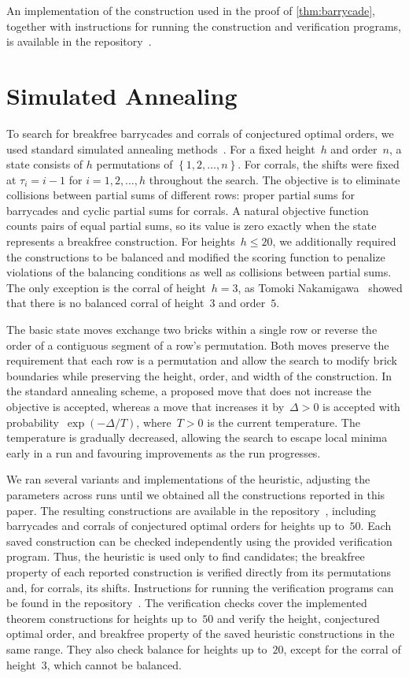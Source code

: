 \documentclass[runningheads,envcountsame]{llncs}
\newcommand{\set}[1]{\left\{ #1 \right\}}
\let\le\leqslant
\begin{document}
An implementation of the construction used in the proof of \cref{thm:barrycade}, together with instructions for running the construction and verification programs, is available in the repository~\cite{repo}.

\section{Simulated Annealing}\label{sec:sa}
To search for breakfree barrycades and corrals of conjectured optimal orders, we used standard simulated annealing methods~\cite{AartsKM2005,KirkpatrickGV1983}.
For a fixed height~$h$ and order~$n$, a state consists of $h$ permutations of $\set{1,2,\ldots,n}$.
For corrals, the shifts were fixed at $\tau_i=i-1$ for $i=1,2,\ldots,h$ throughout the search.
The objective is to eliminate collisions between partial sums of different rows: proper partial sums for barrycades and cyclic partial sums for corrals.
A natural objective function counts pairs of equal partial sums, so its value is zero exactly when the state represents a breakfree construction.
For heights~$h\le20$, we additionally required the constructions to be balanced and modified the scoring function to penalize violations of the balancing conditions as well as collisions between partial sums.
The only exception is the corral of height~$h=3$, as Tomoki Nakamigawa~\cite{Nakamigawa2015} showed that there is no balanced corral of height~$3$ and order~$5$.

The basic state moves exchange two bricks within a single row or reverse the order of a contiguous segment of a row's permutation.
Both moves preserve the requirement that each row is a permutation and allow the search to modify brick boundaries while preserving the height, order, and width of the construction.
In the standard annealing scheme, a proposed move that does not increase the objective is accepted, whereas a move that increases it by~$\Delta>0$ is accepted with probability~$\exp(-\Delta/T)$, where~$T>0$ is the current temperature.
The temperature is gradually decreased, allowing the search to escape local minima early in a run and favouring improvements as the run progresses.

We ran several variants and implementations of the heuristic, adjusting the parameters across runs until we obtained all the constructions reported in this paper.
The resulting constructions are available in the repository~\cite{repo}, including barrycades and corrals of conjectured optimal orders for heights up to~$50$.
Each saved construction can be checked independently using the provided verification program.
Thus, the heuristic is used only to find candidates; the breakfree property of each reported construction is verified directly from its permutations and, for corrals, its shifts.
Instructions for running the verification programs can be found in the repository~\cite{repo}.
The verification checks cover the implemented theorem constructions for heights up to~$50$ and verify the height, conjectured optimal order, and breakfree property of the saved heuristic constructions in the same range.
They also check balance for heights up to~$20$, except for the corral of height~$3$, which cannot be balanced.
\end{document}
